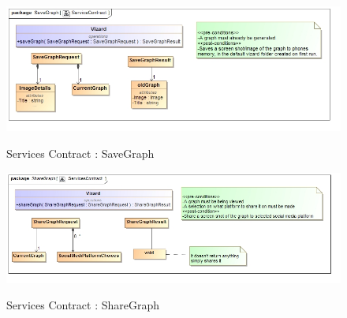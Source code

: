 \documentclass[a4paper,12pt]{article}
\begin{document}
	\begin{figure}[H]
		\includegraphics[width=\textwidth]{Images/class__SaveGraph}  \\
		\caption{Services Contract : SaveGraph}
	\end{figure}
	
	\begin{figure}[H]
		\includegraphics[width=\textwidth]{Images/class__ShareGraph}  \\
		\caption{Services Contract : ShareGraph}
	\end{figure}
\end{document}
